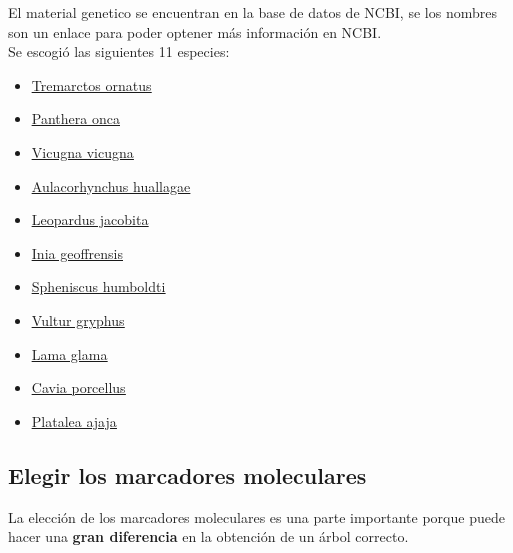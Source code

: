 \documentclass[a4paper]{article}
\begin{document}
\noindent El material genetico se encuentran en la base de datos de NCBI, se los nombres son un enlace para poder optener más información en NCBI.\\

\noindent Se escogió las siguientes 11 especies:
\begin{itemize}
    \item \href{https://www.ncbi.nlm.nih.gov/protein/ABM63279.1/}{\underline{Tremarctos ornatus}}
    
    \item 
    \href{https://www.ncbi.nlm.nih.gov/protein/AIY56286.1}{\underline{Panthera onca}}
    
    \item 
    \href{https://www.ncbi.nlm.nih.gov/protein/ACJ45788.1}{\underline{Vicugna vicugna}}
    
    \item 
    \href{https://www.ncbi.nlm.nih.gov/protein/329756060}{\underline{Aulacorhynchus huallagae}}
    
    \item 
    \href{https://www.ncbi.nlm.nih.gov/protein/YP_009178568.1}{\underline{Leopardus jacobita}}
    
    \item 
    \href{https://www.ncbi.nlm.nih.gov/protein/NP_944712.1}{\underline{Inia geoffrensis}}
    
    \item 
    \href{https://www.ncbi.nlm.nih.gov/protein/AON77377.1}{\underline{Spheniscus humboldti}}
    
    \item 
    \href{https://www.ncbi.nlm.nih.gov/protein/AEH42425.1}{\underline{Vultur gryphus}}
    
    \item 
    \href{https://www.ncbi.nlm.nih.gov/protein/BAH23368.1}{\underline{Lama glama}}
    
    \item 
    \href{https://www.ncbi.nlm.nih.gov/protein/AJE26518.1}{\underline{Cavia porcellus}}
    
    \item 
    \href{https://www.ncbi.nlm.nih.gov/protein/298371651}{\underline{Platalea ajaja}}
    
\end{itemize}


\subsection{Elegir los marcadores moleculares}
La elección de los marcadores moleculares es una parte importante porque puede hacer una \textbf{gran diferencia} en la
obtención de un árbol correcto.
\end{document}
